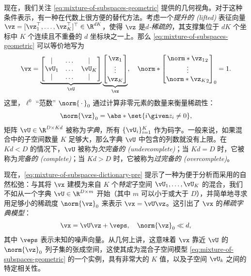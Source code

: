 \documentclass[../../book-main_zh.tex]{subfiles}
\begin{document}
现在，我们关注 \eqref{eq:mixture-of-subspaces-geometric}
提供的几何视角。对于这种条件表示，有一种在代数上很方便的替代方法。考虑一个\textit{提升的 (lifted)} 表征向量 $\vz
= [\vz_1^\top, \dots, \vz_K^\top]^\top \in \R^{dK}$，使得 $\vz$
是\textit{$d$-稀疏的}，其支撑集位于 $dK$ 个坐标中 $K$ 个连续且不重叠的 $d$ 坐标块之一上。那么
\eqref{eq:mixture-of-subspaces-geometric} 可以等价地写为
\begin{equation}\label{eq:mixture-of-subspaces-dictionary-pre}
    \vx =
    \underbrace{
        \begin{bmatrix}
            | & \dots & |  \\
            \vU_1 & \dots & \vU_K  \\
            | & \dots & |
        \end{bmatrix}
    }_{\vU}
    \underbrace{
        \begin{bmatrix} \vz_1 \\ \vdots \\ \vz_K
        \end{bmatrix}
    }_{\vz},
    \quad
    \norm*{
        \begin{bmatrix} \norm*{\vz_1}_2 \\ \vdots \\ \norm*{\vz_K}_2
        \end{bmatrix}
    }_0 = 1.
\end{equation}
这里，$\ell^0$ “范数” $\norm{\,\cdot\,}_0$ 通过计算非零元素的数量来衡量稀疏性：
\begin{equation}\label{eq:ell-zero-norm}
    \norm{\vz}_0 = \abs*{\set{i \given z_i \neq 0}},
\end{equation}
矩阵 $\vU \in \R^{D \times Kd}$ 被称为\textit{字典}，所有 $\{\vU_i\}_{i=1}^K$
作为码字。一般来说，如果混合中的子空间数量 $K$ 足够大，那么字典 $\vU$ 中包含的列数就没有上限。在 $Kd < D$
的情况下，$\vU$ 被称为\textit{欠完备的 (undercomplete)}；当 $Kd = D$
时，它被称为\textit{完备的 (complete)}；当 $Kd > D$ 时，它被称为\textit{过完备的 (overcomplete)}。

现在，\eqref{eq:mixture-of-subspaces-dictionary-pre} 提示了一种为便于分析而采用的自然松弛：与其将 $\vx$ 建模为来自 $K$ 个\textit{特定}子空间 $\vU_1,
\dots, \vU_K$ 的混合，我们不如从一个字典 $\vU \in \R^{D \times m}$ 开始（其中 $m$
可以小于或大于 $D$），并简单地寻求用足够小的稀疏度 $\norm{\vz}_0$ 来表示 $\vx = \vU \vz$。这引出了
$\vx$ 的\textit{稀疏字典模型}：
\begin{equation}\label{eq:mixture-of-subspaces-dictionary}
    \vx =  \vU \vz + \veps,
    \quad
    \norm{\vz}_0 \ll d,
\end{equation}
其中 $\veps$ 表示未知的噪声向量。从几何上讲，这意味着 $\vx$ 靠近 $\vU$ 的 $\norm{\vz}_0$
列子集的张成空间，这使其成为混合子空间模型 \eqref{eq:mixture-of-subspaces-geometric}
的一个实例，具有非常大的 $K$ 值，以及子空间 $\vU_k$ 之间的特定相关性。
\end{document}
